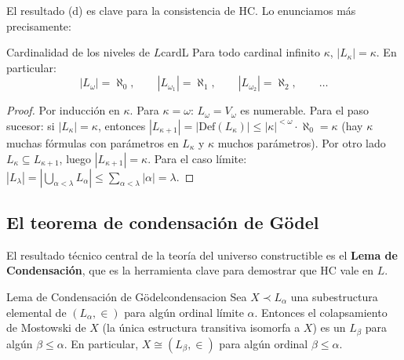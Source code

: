 El resultado (d) es clave para la consistencia de HC. Lo enunciamos más precisamente:

\begin{proposicion}{Cardinalidad de los niveles de $L$}{cardL}
Para todo cardinal infinito $\kappa$, $|L_\kappa| = \kappa$. En particular:
\[
  |L_{\omega}| = \aleph_0, \qquad |L_{\omega_1}| = \aleph_1, \qquad |L_{\omega_2}| = \aleph_2, \qquad \ldots
\]
\end{proposicion}

\begin{proof}
Por inducción en $\kappa$. Para $\kappa = \omega$: $L_\omega = V_\omega$ es numerable. Para el paso sucesor: si $|L_\kappa| = \kappa$, entonces $|L_{\kappa+1}| = |\mathrm{Def}(L_\kappa)| \leq |\kappa|^{<\omega} \cdot \aleph_0 = \kappa$ (hay $\kappa$ muchas fórmulas con parámetros en $L_\kappa$ y $\kappa$ muchos parámetros). Por otro lado $L_\kappa \subseteq L_{\kappa+1}$, luego $|L_{\kappa+1}| = \kappa$. Para el caso límite: $|L_\lambda| = |\bigcup_{\alpha < \lambda} L_\alpha| \leq \sum_{\alpha < \lambda} |\alpha| = \lambda$.
\end{proof}

\subsection{El teorema de condensación de Gödel}

El resultado técnico central de la teoría del universo constructible es el \textbf{Lema de Condensación}, que es la herramienta clave para demostrar que HC vale en $L$.

\begin{teorema}{Lema de Condensación de Gödel}{condensacion}
Sea $X \prec L_\alpha$ una subestructura elemental de $(L_\alpha, \in)$ para algún ordinal límite $\alpha$. Entonces el colapsamiento de Mostowski de $X$ (la única estructura transitiva isomorfa a $X$) es un $L_\beta$ para algún $\beta \leq \alpha$. En particular, $X \cong (L_\beta, \in)$ para algún ordinal $\beta \leq \alpha$.
\end{teorema}

